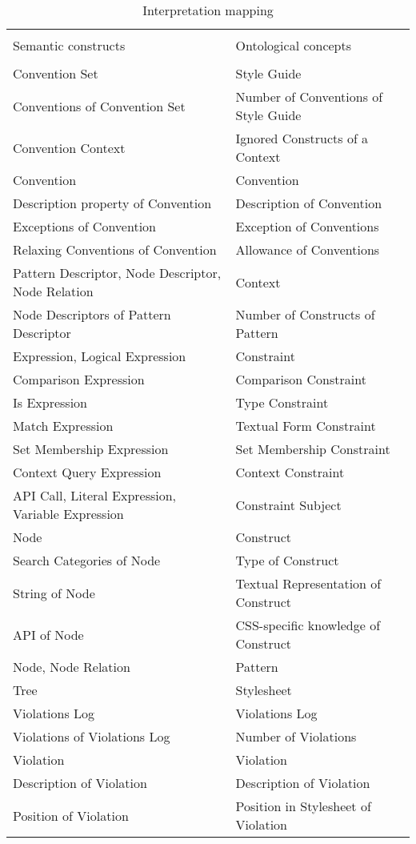 \documentclass[parskip=full]{uvamscse}
\begin{document}
\begin{center}
\begin{longtable}{ | p{23em} | p{17em} | } 
\caption{Interpretation mapping}\\
\hline
 &  \\
Semantic constructs & Ontological concepts  \\
 &  \\
\hline

Convention Set & Style Guide \\ \hline
Conventions of Convention Set & Number of Conventions of Style Guide \\ \hline
Convention Context & Ignored Constructs of a Context \\ \hline
Convention & Convention \\ \hline
Description property of Convention & Description of Convention \\ \hline
Exceptions of Convention & Exception of Conventions \\ \hline
Relaxing Conventions of Convention & Allowance of Conventions \\ \hline
Pattern Descriptor, Node Descriptor, Node Relation & Context \\ \hline
Node Descriptors of Pattern Descriptor & Number of Constructs of Pattern \\ \hline
Expression, Logical Expression & Constraint \\ \hline
Comparison Expression & Comparison Constraint \\ \hline
Is Expression & Type Constraint \\ \hline
Match Expression  & Textual Form Constraint \\ \hline
Set Membership Expression & Set Membership Constraint \\ \hline
Context Query Expression & Context Constraint \\ \hline
API Call, Literal Expression, Variable Expression & Constraint Subject \\ \hline
Node & Construct \\ \hline
Search Categories of Node & Type of Construct \\ \hline
String of Node & Textual Representation of Construct \\ \hline
API of Node & CSS-specific knowledge of Construct \\ \hline
Node, Node Relation & Pattern \\ \hline
Tree & Stylesheet \\ \hline
Violations Log & Violations Log \\ \hline
Violations of Violations Log & Number of Violations \\ \hline
Violation & Violation \\ \hline
Description of Violation & Description of Violation \\ \hline
Position of Violation & Position in Stylesheet of Violation \\ \hline
\end{longtable}
\end{center}
\end{document}
